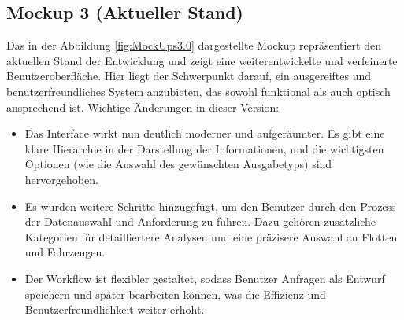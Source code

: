 \subsection*{Mockup 3 (Aktueller Stand)}
Das in der Abbildung \ref{fig:MockUps3.0} dargestellte Mockup repräsentiert den aktuellen Stand der Entwicklung und zeigt eine weiterentwickelte und verfeinerte Benutzeroberfläche. Hier liegt der Schwerpunkt darauf, ein ausgereiftes und benutzerfreundliches System anzubieten, das sowohl funktional als auch optisch ansprechend ist.
\newline
Wichtige Änderungen in dieser Version:
\begin{itemize}
    \item Das Interface wirkt nun deutlich moderner und aufgeräumter. Es gibt eine klare Hierarchie in der Darstellung der Informationen, und die wichtigsten Optionen (wie die Auswahl des gewünschten Ausgabetyps) sind hervorgehoben.
    \item Es wurden weitere Schritte hinzugefügt, um den Benutzer durch den Prozess der Datenauswahl und Anforderung zu führen. Dazu gehören zusätzliche Kategorien für detailliertere Analysen und eine präzisere Auswahl an Flotten und Fahrzeugen.
    \item Der Workflow ist flexibler gestaltet, sodass Benutzer Anfragen als Entwurf speichern und später bearbeiten können, was die Effizienz und Benutzerfreundlichkeit weiter erhöht.
\end{itemize}
